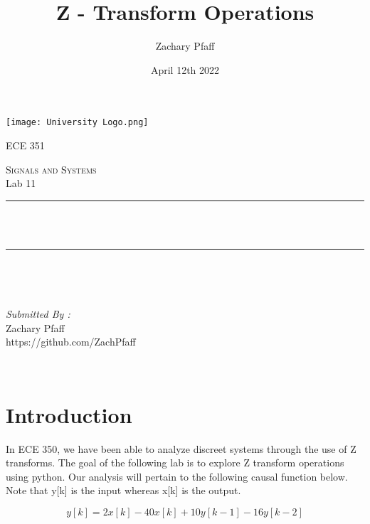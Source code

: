 \documentclass[12pt]{report}
\title{Z - Transform Operations}
\author{Zachary Pfaff}
\date{April 12th 2022}
\makeatletter
\let\thetitle\@title
\makeatother
\begin{document}
\begin{titlepage}
\centering
\vspace*{0.5 cm}
\texttt{[image: University Logo.png]}\\
\begin{center}    \textsc{\Large   ECE 351}\\[2.0 cm]
\end{center}%
\textsc{\Large Signals and Systems  }\\[0.5 cm] %
Lab 11
\rule{\linewidth}{0.2 mm} \\[0.4 cm]
{ \huge \bfseries \thetitle}\\
\rule{\linewidth}{0.2 mm} \\[1.5 cm]
\begin{minipage}{0.4\textwidth}
\begin{flushleft} \large
\end{flushleft}
\end{minipage}~
\begin{minipage}{0.4\textwidth}
\begin{flushright} \large
\emph{Submitted By :} \\
Zachary Pfaff\\https://github.com/ZachPfaff
\end{flushright}
\end{minipage}\\[2 cm]
\end{titlepage}
\tableofcontents
\pagebreak
\renewcommand{\thesection}{\arabic{section}}
\setlength{\parindent}{20pt}

\maketitle
\section{Introduction}
\hspace{\parindent}In ECE 350, we have been able to analyze discreet systems through the use of Z transforms. The goal of the following lab is to explore Z transform operations using python. Our analysis will pertain to the following causal function below. Note that y[k] is the input whereas x[k] is the output. \par
\[y[k] = 2x[k] - 40x[k] + 10y[k-1] - 16y[k-2]\]
\end{document}
